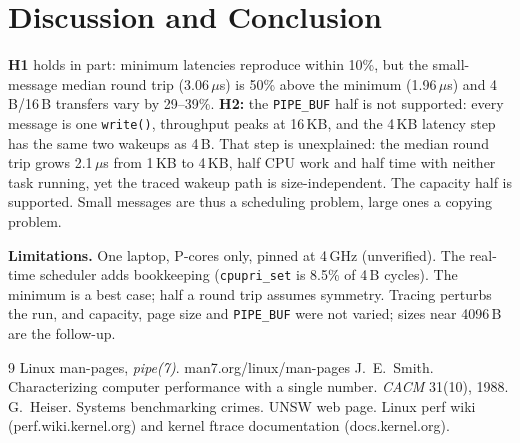 \documentclass[11pt,twocolumn]{article}
\begin{document}
\section{Discussion and Conclusion}
\textbf{H1} holds in part: minimum latencies reproduce within 10\%, but the small-message median round trip (3.06\,$\mu$s) is 50\% above the minimum (1.96\,$\mu$s) and 4\,B/16\,B transfers vary by 29--39\%. \textbf{H2:} the \texttt{PIPE\_BUF} half is not supported: every message is one \texttt{write()}, throughput peaks at 16\,KB, and the 4\,KB latency step has the same two wakeups as 4\,B. That step is unexplained: the median round trip grows 2.1\,$\mu$s from 1\,KB to 4\,KB, half CPU work and half time with neither task running, yet the traced wakeup path is size-independent. The capacity half is supported. Small messages are thus a scheduling problem, large ones a copying problem.

\textbf{Limitations.} One laptop, P-cores only, pinned at 4\,GHz (unverified). The real-time scheduler adds bookkeeping (\texttt{cpupri\_set} is 8.5\% of 4\,B cycles). The minimum is a best case; half a round trip assumes symmetry. Tracing perturbs the run, and capacity, page size and \texttt{PIPE\_BUF} were not varied; sizes near 4096\,B are the follow-up.

\begin{thebibliography}{9}\footnotesize\setlength{\itemsep}{0pt}\setlength{\parsep}{0pt}
 Linux man-pages, \emph{pipe(7)}. man7.org/linux/man-pages
 J.~E.~Smith. Characterizing computer performance with a single number. \emph{CACM} 31(10), 1988.
 G.~Heiser. Systems benchmarking crimes. UNSW web page.
 Linux perf wiki (perf.wiki.kernel.org) and kernel ftrace documentation (docs.kernel.org).
\end{thebibliography}
\end{document}
